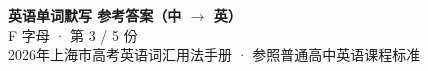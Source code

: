 \documentclass[10pt,a4paper]{article}
\begin{document}
\pagestyle{plain}

\begin{center}
{\LARGE\bfseries 英语单词默写 \quad 参考答案（中 $\to$ 英）}\\[0.22em]
{\large F 字母 · 第 3 / 5 份}\\[0.18em]
{\small 2026年上海市高考英语词汇用法手册 · 参照普通高中英语课程标准}
\end{center}

\vspace{0.2em}
\noindent{\color{rulegray}\rule{\textwidth}{0.8pt}}

\vspace{0.35em}

\vspace{0.25em}
\renewcommand{\arraystretch}{1.32}
\end{document}
